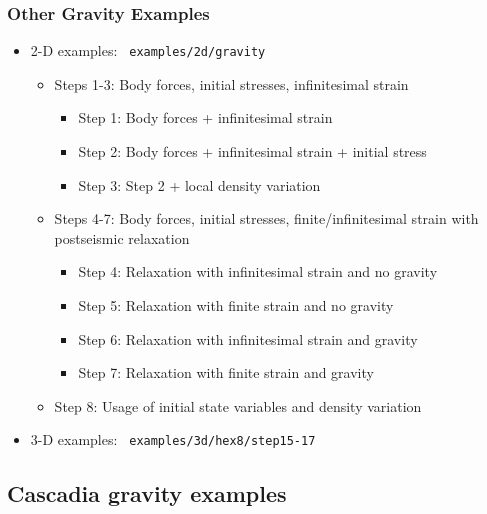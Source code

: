 \documentclass{beamer}
\begin{document}
\begin{frame}
  \frametitle{Other Gravity Examples}
  \summary{}

  \begin{itemize}
  \item 2-D examples: {\tt\color{red} examples/2d/gravity}
  \begin{itemize}
    \item Steps 1-3: Body forces, initial stresses, infinitesimal strain
      \begin{itemize}
      \item Step 1: Body forces + infinitesimal strain
      \item Step 2: Body forces + infinitesimal strain + initial stress
      \item Step 3: Step 2 + local density variation
      \end{itemize}
    \item Steps 4-7: Body forces, initial stresses,
      finite/infinitesimal strain with postseismic relaxation
      \begin{itemize}
      \item Step 4: Relaxation with infinitesimal strain and no gravity
      \item Step 5: Relaxation with finite strain and no gravity
      \item Step 6: Relaxation with infinitesimal strain and gravity
      \item Step 7: Relaxation with finite strain and gravity
      \end{itemize}
    \item Step 8: Usage of initial state variables and density
      variation
    \end{itemize}
  \item 3-D examples: {\tt\color{red} examples/3d/hex8/step15-17}
  \end{itemize}
  
\end{frame}


\subsection{Cascadia gravity examples}
\end{document}
